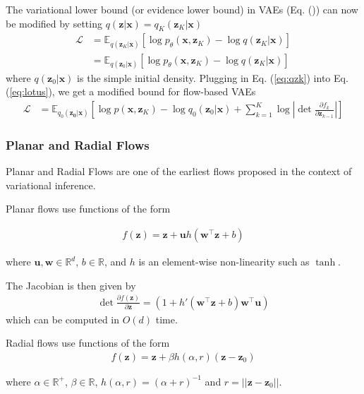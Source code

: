 \documentclass[runningheads]{llncs}
\begin{document}
The variational lower bound (or evidence lower bound) in VAEs (Eq. ()) can now be modified by setting $q(\mathbf{z}|\mathbf{x}) = q_K(\mathbf{z}_K|\mathbf{x})$
\begin{align}
\mathcal{L} &= \mathbb{E}_{q(\mathbf{z}_K|\mathbf{x})}\left[\log p_\theta(\mathbf{x}, \mathbf{z}_K) - \log q(\mathbf{z}_K|\mathbf{x})\right]\\
&= \mathbb{E}_{q(\mathbf{z}_0|\mathbf{x})}\left[\log p_\theta(\mathbf{x}, \mathbf{z}_K) - \log q(\mathbf{z}_K|\mathbf{x})\right]\label{eq:lotus}
\end{align}
where $q(\mathbf{z}_0|\mathbf{x})$ is the simple initial density. Plugging in Eq. (\ref{eq:qzk}) into Eq. (\ref{eq:lotus}), we get a modified bound for flow-based VAEs
\begin{align}
\mathcal{L} &= \mathbb{E}_{q_0(\mathbf{z_0}|\mathbf{x})}\left[\log p(\mathbf{x},\mathbf{z}_K) - \log q_0(\mathbf{z}_0|\mathbf{x}) + \sum_{k=1}^K\log\left|\det \frac{\partial f_k}{\partial \mathbf{z}_{k-1}}\right| \right]
\end{align}
\subsubsection{Planar and Radial Flows} 
Planar and Radial Flows \cite{rezende2015variational} are one of the earliest flows proposed in the context of variational inference. 

Planar flows use functions of the form

\begin{align}
f(\mathbf{z}) = \mathbf{z} + \mathbf{u}h(\mathbf{w}^\top\mathbf{z} + b)
\label{eq:planarfn}
\end{align}

where $\mathbf{u},\mathbf{w}\in \mathbb{R}^d$, $b \in \mathbb{R}$, and $h$ is an element-wise non-linearity such as $\tanh$.

The Jacobian is then given by
\begin{align}
\det\frac{\partial f(\mathbf{z})}{\partial \mathbf{z}} =(1 + h'(\mathbf{w}^\top\mathbf{z} + b)\mathbf{w}^\top\mathbf{u})
\end{align}
which can be computed in $O(d)$ time.

Radial flows use functions of the form
\begin{align}
f(\mathbf{z}) = \mathbf{z} + \beta h(\alpha,r)(\mathbf{z}-\mathbf{z}_0)
\label{eq:radialfn}
\end{align}

where $\alpha \in \mathbb{R}^+$, $\beta \in \mathbb{R}$, $h(\alpha,r) = (\alpha + r)^{-1}$ and $r = \vert\vert\mathbf{z} - \mathbf{z}_0\vert\vert$.
\end{document}
